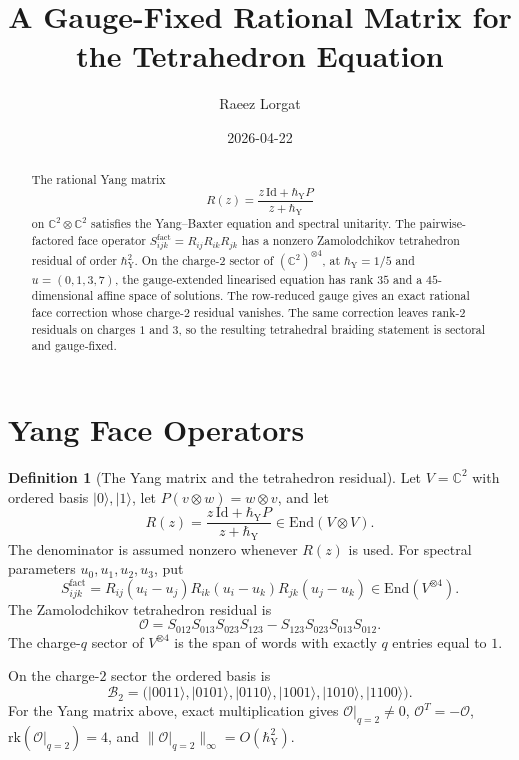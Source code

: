 \documentclass[11pt]{amsart}
\title{A Gauge-Fixed Rational Matrix for the Tetrahedron Equation}
\author{Raeez Lorgat}
\date{2026-04-22}
\theoremstyle{definition}
\newtheorem{definition}[theorem]{Definition}
\theoremstyle{remark}
\newcommand{\End}{\mathrm{End}}
\newcommand{\rk}{\mathrm{rk}}
\newcommand{\C}{\mathbb{C}}
\newcommand{\ket}[1]{|#1\rangle}
\begin{document}
\maketitle

\begin{abstract}
The rational Yang matrix
\[
  R(z)=\frac{z\,\mathrm{Id}+\hbar_{\mathrm{Y}}P}{z+\hbar_{\mathrm{Y}}}
\]
on $\C^2\otimes \C^2$ satisfies the Yang--Baxter equation and spectral
unitarity.  The pairwise-factored face operator
$S^{\mathrm{fact}}_{ijk}=R_{ij}R_{ik}R_{jk}$ has a nonzero
Zamolodchikov tetrahedron residual of order $\hbar_{\mathrm{Y}}^2$.
On the charge-$2$ sector of $(\C^2)^{\otimes 4}$, at
$\hbar_{\mathrm{Y}}=1/5$ and $u=(0,1,3,7)$, the gauge-extended
linearised equation has rank $35$ and a $45$-dimensional affine space of
solutions.  The row-reduced gauge gives an exact rational face correction
whose charge-$2$ residual vanishes.  The same correction leaves rank-$2$
residuals on charges $1$ and $3$, so the resulting tetrahedral braiding
statement is sectoral and gauge-fixed.
\end{abstract}

\section{Yang Face Operators}

\begin{definition}[The Yang matrix and the tetrahedron residual]
Let $V=\C^2$ with ordered basis $\ket{0},\ket{1}$, let
$P(v\otimes w)=w\otimes v$, and let
\[
  R(z)=\frac{z\,\mathrm{Id}+\hbar_{\mathrm{Y}}P}{z+\hbar_{\mathrm{Y}}}
  \in \End(V\otimes V).
\]
The denominator is assumed nonzero whenever $R(z)$ is used.
For spectral parameters $u_0,u_1,u_2,u_3$, put
\[
  S^{\mathrm{fact}}_{ijk}
  =
  R_{ij}(u_i-u_j)R_{ik}(u_i-u_k)R_{jk}(u_j-u_k)
  \in \End(V^{\otimes 4}).
\]
The Zamolodchikov tetrahedron residual is
\[
  \mathcal O
  =
  S_{012}S_{013}S_{023}S_{123}
  -
  S_{123}S_{023}S_{013}S_{012}.
\]
The charge-$q$ sector of $V^{\otimes 4}$ is the span of words with
exactly $q$ entries equal to $1$.
\end{definition}

On the charge-$2$ sector the ordered basis is
\[
  \mathcal B_2=
  \bigl(
    \ket{0011},\ket{0101},\ket{0110},
    \ket{1001},\ket{1010},\ket{1100}
  \bigr).
\]
For the Yang matrix above, exact multiplication gives
$\mathcal O|_{q=2}\neq 0$, $\mathcal O^T=-\mathcal O$,
$\rk(\mathcal O|_{q=2})=4$, and
$\|\mathcal O|_{q=2}\|_\infty=O(\hbar_{\mathrm{Y}}^2)$.
\end{document}
